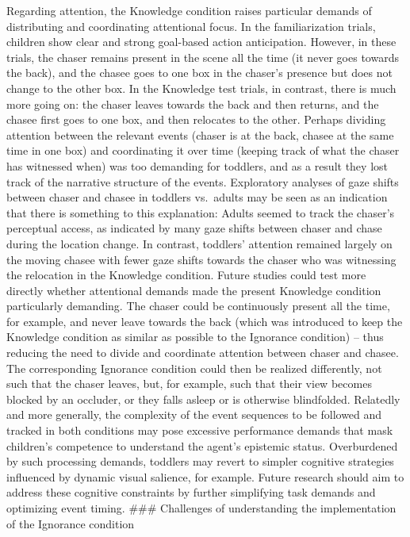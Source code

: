 \documentclass[
  man,floatsintext]{apa6}
\begin{document}
Regarding attention, the Knowledge condition raises particular demands of distributing and coordinating attentional focus. In the familiarization trials, children show clear and strong goal-based action anticipation. However, in these trials, the chaser remains present in the scene all the time (it never goes towards the back), and the chasee goes to one box in the chaser's presence but does not change to the other box. In the Knowledge test trials, in contrast, there is much more going on: the chaser leaves towards the back and then returns, and the chasee first goes to one box, and then relocates to the other. Perhaps dividing attention between the relevant events (chaser is at the back, chasee at the same time in one box) and coordinating it over time (keeping track of what the chaser has witnessed when) was too demanding for toddlers, and as a result they lost track of the narrative structure of the events. Exploratory analyses of gaze shifts between chaser and chasee in toddlers vs.~adults may be seen as an indication that there is something to this explanation: Adults seemed to track the chaser's perceptual access, as indicated by many gaze shifts between chaser and chase during the location change. In contrast, toddlers' attention remained largely on the moving chasee with fewer gaze shifts towards the chaser who was witnessing the relocation in the Knowledge condition. Future studies could test more directly whether attentional demands made the present Knowledge condition particularly demanding. The chaser could be continuously present all the time, for example, and never leave towards the back (which was introduced to keep the Knowledge condition as similar as possible to the Ignorance condition) -- thus reducing the need to divide and coordinate attention between chaser and chasee. The corresponding Ignorance condition could then be realized differently, not such that the chaser leaves, but, for example, such that their view becomes blocked by an occluder, or they falls asleep or is otherwise blindfolded.
Relatedly and more generally, the complexity of the event sequences to be followed and tracked in both conditions may pose excessive performance demands that mask children's competence to understand the agent's epistemic status. Overburdened by such processing demands, toddlers may revert to simpler cognitive strategies influenced by dynamic visual salience, for example. Future research should aim to address these cognitive constraints by further simplifying task demands and optimizing event timing.
\#\#\# Challenges of understanding the implementation of the Ignorance condition
\end{document}
